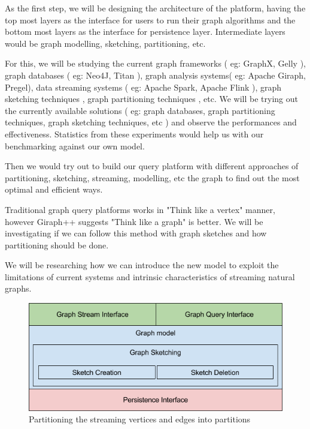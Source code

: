 \documentclass[12pt]{article}
\begin{document}
As the first step, we will be designing the architecture of the platform, having the top most layers as the interface for users to run their graph algorithms and the bottom most layers as the interface for persistence layer. Intermediate layers would be graph modelling, sketching, partitioning, etc. 
 
For this, we will be studying the current graph frameworks ( eg: GraphX, Gelly ), graph databases ( eg: Neo4J, Titan ), graph analysis systems( eg: Apache Giraph, Pregel), data streaming systems ( eg: Apache Spark, Apache Flink ), graph sketching techniques \cite{GraphSketches}, graph partitioning techniques \cite{PowerGraph} \cite{S-PowerGraph}, etc. We will be trying out the currently available solutions ( eg: graph databases, graph partitioning techniques, graph sketching techniques, etc ) and observe the performances and effectiveness. Statistics from these experiments would help us with our benchmarking against our own model. 

 Then we would try out to build our query platform with different approaches of partitioning, sketching, streaming, modelling, etc the graph to find out the most optimal and efficient ways. 
 
 Traditional graph query platforms works in "Think like a vertex" manner, however Giraph++ \cite{GiraphPlusPlus} suggests "Think like a graph" is better. We will be investigating if we can follow this method with graph sketches and how partitioning should be done.

We will be researching how we can introduce the new model to exploit the limitations of current systems and intrinsic characteristics of streaming natural graphs.

\begin{figure}[H]
\centering
\includegraphics[width=\textwidth]{image01.png}
\caption{Partitioning the streaming vertices and edges into partitions }
\label{fig:partitioning}
\end{figure}
\end{document}
